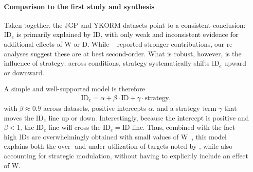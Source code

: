 \documentclass[acmlarge, manuscript,review]{acmart}
\newcommand{\ide}{\ensuremath{{\text{ID}_e}}\xspace}
\begin{document}
\paragraph{Comparison to the first study and synthesis}
Taken together, the JGP and YKORM datasets point to a consistent conclusion: \ide is primarily explained by ID, with only weak and inconsistent evidence for additional effects of W or D. While \citeauthor{zhai2004nominal}~\cite{zhai2004nominal} reported stronger contributions, our re-analyses suggest these are at best second-order. What is robust, however, is the influence of strategy: across conditions, strategy systematically shifts \ide upward or downward.

A simple and well-supported model is therefore
\begin{align}
\ide = \alpha + \beta\cdot{}\text{ID} + \gamma\cdot{}\text{strategy}, \label{eq:model_ide_simple}
\end{align}
with $\beta \approx 0.9$ across datasets, positive intercepts $\alpha$, and a strategy term $\gamma$ that moves the \ide line up or down. 
Interestingly, because the intercept is positive and $\beta < 1$, the \ide line will cross the $\ide = \text{ID}$ line. Thus, combined with the fact high IDs are overwhelmingly obtained with small values of W~\cite{gori2018chi,guiard2009}, this model explains both the over- and under-utilization of targets noted by \citeauthor{zhai2004nominal}, while also accounting for strategic modulation, without having to explicitly include an effect of W.



\end{document}
